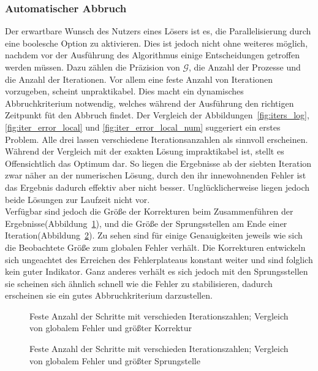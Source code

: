 \subsubsection*{Automatischer Abbruch}
Der erwartbare Wunsch des Nutzers eines Lösers ist es, die Parallelisierung durch eine boolesche Option zu aktivieren. Dies ist jedoch nicht ohne weiteres möglich, nachdem vor der Ausführung des Algorithmus einige Entscheidungen getroffen werden müssen. Dazu zählen die Präzision von \(\mathcal{G}\), die Anzahl der Prozesse und die Anzahl der Iterationen. Vor allem eine feste Anzahl von Iterationen vorzugeben, scheint unpraktikabel. Dies macht ein dynamisches Abbruchkriterium notwendig, welches während der Ausführung den richtigen Zeitpunkt füt den Abbruch findet. Der Vergleich der Abbildungen~\ref{fig:iters_log}, \ref{fig:iter_error_local} und \ref{fig:iter_error_local_num} suggeriert ein erstes Problem. Alle drei lassen verschiedene Iterationsanzahlen als sinnvoll erscheinen. Während der Vergleich mit der exakten Lösung impraktikabel ist, stellt es Offensichtlich das Optimum dar. So liegen die Ergebnisse ab der siebten Iteration zwar näher an der numerischen Lösung, durch den ihr innewohnenden Fehler ist das Ergebnis dadurch effektiv aber nicht besser. Unglücklicherweise liegen jedoch beide Lösungen zur Laufzeit nicht vor.\\

Verfügbar sind jedoch die Größe der Korrekturen beim Zusammenführen der Ergebnisse(Abbildung~\ref{fig:error_corr}), und die Größe der Sprungsstellen am Ende einer Iteration(Abbildung~\ref{fig:error_disc}). Zu sehen sind für einige Genauigkeiten jeweils wie sich die Beobachtete Größe zum globalen Fehler verhält. Die Korrekturen entwickeln sich ungeachtet des Erreichen des Fehlerplateaus konstant weiter und sind folglich kein guter Indikator. Ganz anderes verhält es sich jedoch mit den Sprungsstellen sie scheinen sich ähnlich schnell wie die Fehler zu stabilisieren, dadurch erscheinen sie ein gutes Abbruchkriterium darzustellen.

\begin{figure}[ht]
    \centering
        
    \caption{Feste Anzahl der Schritte mit verschieden Iterationszahlen; Vergleich von globalem Fehler und größter Korrektur}
    \label{fig:error_corr}
\end{figure}
\begin{figure}[ht]
    \centering
        
    \caption{Feste Anzahl der Schritte mit verschieden Iterationszahlen; Vergleich von globalem Fehler und größter Sprungstelle}
    \label{fig:error_disc}
\end{figure}

